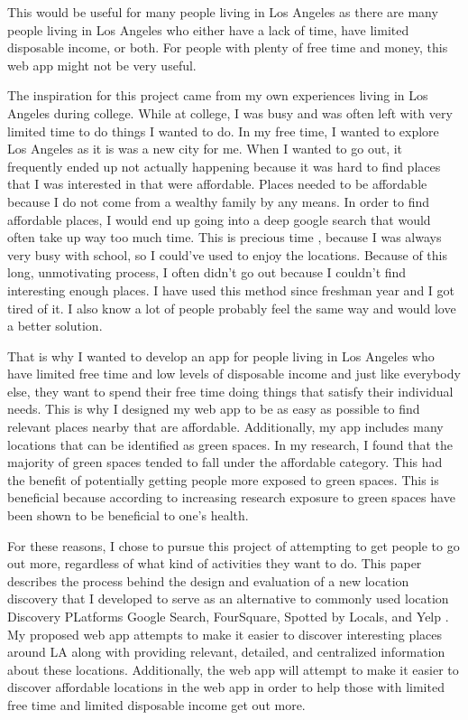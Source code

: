 \documentclass[12pt,twocolumn]{article}
\begin{document}
This would be useful for many people living in Los Angeles as there are many people living in Los Angeles who either have a lack of time, have limited disposable income, or both. For people with plenty of free time and money, this web app might not be very useful.

The inspiration for this project came from my own experiences living in  Los Angeles during college. While at college, I was busy and was often left with very limited time to do things I wanted to do. In my free time, I wanted to explore Los Angeles as it is was a new city for me. When I wanted to go out, it frequently ended up not actually happening because it was hard to find places that I was interested in that were affordable. Places needed to be affordable because I do not come from a wealthy family by any means. In order to find affordable places, I would end up going into a deep google search that would often take up way too much time. This is precious time , because I was always very busy with school, so I could've used to enjoy the locations. Because of this long, unmotivating  process, I often didn't go out because I couldn't find interesting enough places. I have used this method since freshman year and I got tired of it. I also know a lot of people probably feel the same way and would love a better solution. 

That is why I wanted to develop an app for people living in Los Angeles who have limited free time  and low levels of  disposable income and just like everybody else, they want to spend their free time doing things that satisfy their individual needs. This is why I designed my web app to be as easy as possible to find relevant places nearby that are affordable. Additionally, my app includes many locations that can be identified as green spaces. In my research, I found that the majority of green spaces tended to fall under the affordable category. This had the benefit of potentially getting people more exposed to green spaces. This is beneficial because according to increasing research exposure to green spaces have been shown to be beneficial to one’s health\cite{TRAN2022206}. 

For these reasons, I chose to pursue this project of attempting to get people to go out more, regardless of what kind of activities they want to do. This paper describes the process behind the design and  evaluation of a new location discovery that I developed to serve as an alternative to commonly used location Discovery PLatforms Google Search, FourSquare, Spotted by Locals, and Yelp . My proposed web app attempts to make it easier to discover interesting places around LA along with providing relevant, detailed, and centralized information about these locations. Additionally, the web app will attempt to make it easier to discover affordable locations in the web app in order to help those with limited free time and limited disposable income get out more. 
\end{document}
